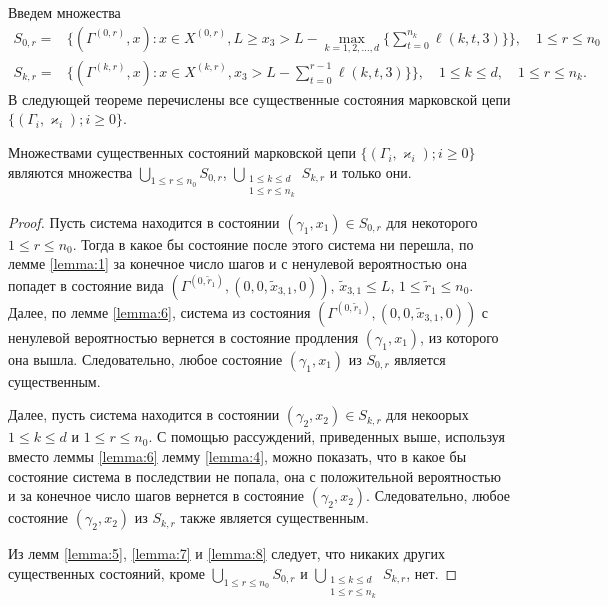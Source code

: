 \documentclass[a4paper,12pt,russian]{extarticle}
\newcommand{\Mark}{\{(\Gamma_i, \varkappa_i); i \geqslant 0\}}
\begin{document}
Введем множества
\begin{equation*}
\begin{aligned}
S_{0,r} = & \{(\Gamma^{(0,r)},x) \colon x\in X^{(0,r)}, L \geqslant x_3 > L - \max\limits_{k=1, 2, \ldots, d}\{\sum_{t=0}^{n_k} \ell(k,t,3)\}\}, \quad 1 \leqslant r \leqslant n_0 \\
S_{k,r} = & \{(\Gamma^{(k,r)},x) \colon x\in X^{(k,r)},x_3 > L - \sum_{t=0}^{r-1} \ell(k,t,3)\} \}, \quad 1 \leqslant k \leqslant d,\quad 1 \leqslant r \leqslant n_k.
\end{aligned}
\end{equation*}
В следующей теореме перечислены все существенные состояния марковской цепи $\Mark$.
\begin{theorem}
Множествами существенных состояний марковской цепи $\Mark$ являются множества $\bigcup\limits_{1 \leqslant r \leqslant n_0}S_{0,r}$, $\bigcup\limits_{\substack{1 \leqslant k \leqslant d\\ 1 \leqslant r \leqslant n_k}} S_{k,r}$ и только они.
\end{theorem}
\begin{proof}
Пусть система находится в состоянии $(\gamma_1,x_1) \in S_{0,r}$ для некоторого $1 \leqslant r \leqslant n_0$. Тогда в какое бы состояние после этого система ни перешла, по лемме \ref{lemma:1} за конечное число шагов и с ненулевой вероятностью она попадет в состояние вида $(\Gamma^{(0,\tilde{r}_1)}, (0,0,\tilde{x}_{3,1},0))$, $\tilde{x}_{3,1} \leqslant L$, $1 \leqslant \tilde{r}_1 \leqslant n_0$.  Далее, по лемме \ref{lemma:6}, система из состояния $(\Gamma^{(0,\tilde{r}_1)}, (0,0,\tilde{x}_{3,1},0))$ с ненулевой вероятностью вернется в состояние продления $(\gamma_1,x_1)$, из которого она вышла. Следовательно, любое состояние $(\gamma_1,x_1)$ из $S_{0,r}$ является существенным.

Далее, пусть система находится в состоянии $(\gamma_2,x_2) \in S_{k,r}$ для некоорых $1 \leqslant k \leqslant d$ и  $1 \leqslant r \leqslant n_0$. С помощью рассуждений, приведенных выше, используя вместо леммы \ref{lemma:6} лемму \ref{lemma:4}, можно показать, что в какое бы состояние система в последствии не попала, она с положительной вероятностью и за конечное число шагов вернется в состояние $(\gamma_2,x_2)$. Следовательно, любое состояние $(\gamma_2,x_2)$ из $S_{k,r}$ также является существенным.

Из лемм \ref{lemma:5}, \ref{lemma:7} и \ref{lemma:8} следует, что никаких других существенных состояний, кроме $\bigcup\limits_{1 \leqslant r \leqslant n_0}S_{0,r}$ и $\bigcup\limits_{\substack{1 \leqslant k \leqslant d\\ 1 \leqslant r \leqslant n_k}} S_{k,r}$,  нет.
\end{proof}
\end{document}
